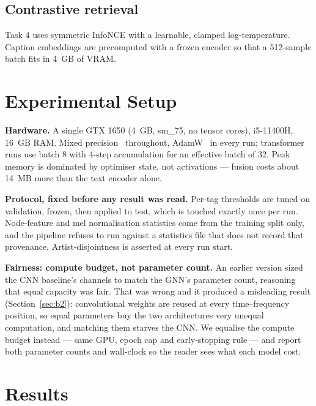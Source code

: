 \documentclass[conference]{IEEEtran}
\begin{document}
\subsection{Contrastive retrieval}
Task 4 uses symmetric InfoNCE \cite{oord2018cpc} with a learnable, clamped
log-temperature. Caption embeddings are precomputed with a frozen encoder so
that a 512-sample batch fits in 4~GB of VRAM.

\section{Experimental Setup}
\textbf{Hardware.} A single GTX 1650 (4~GB, sm\_75, no tensor cores),
i5-11400H, 16~GB RAM. Mixed precision~\cite{micikevicius2018amp} throughout,
AdamW~\cite{loshchilov2019adamw} in every run; transformer runs use batch 8
with 4-step accumulation for an effective batch of 32. Peak memory is dominated
by optimiser state, not activations --- fusion costs about 14~MB more than the
text encoder alone.

\textbf{Protocol, fixed before any result was read.} Per-tag thresholds are
tuned on validation, frozen, then applied to test, which is touched exactly once
per run. Node-feature and mel normalisation statistics come from the training
split only, and the pipeline refuses to run against a statistics file that does
not record that provenance. Artist-disjointness is asserted at every run start.

\textbf{Fairness: compute budget, not parameter count.}
\label{sec:fairness}
An earlier version sized the CNN baseline's channels to match the GNN's
parameter count, reasoning that equal capacity was fair. That was wrong and it
produced a misleading result (Section~\ref{sec:b2}): convolutional weights are
reused at every time--frequency position, so equal parameters buy the two
architectures very unequal computation, and matching them starves the CNN. We
equalise the compute budget instead --- same GPU, epoch cap and early-stopping
rule --- and report both parameter counts and wall-clock so the reader sees what
each model cost.

\section{Results}
\end{document}
